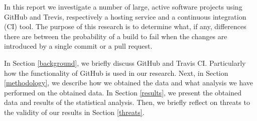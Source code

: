 In this report we investigate a number of large, active software projects using GitHub and Trevis, respectively a hosting service and a continuous integration (CI) tool.
The purpose of this research is to determine what, if any, differences there are between the probability of a build to fail when the changes are introduced by a single commit or a pull request.

In Section \ref{background}, we briefly discuss GitHub and Travis CI.
Particularly how the functionality of GitHub is used in our research.
Next, in Section \ref{methodology}, we describe how we obtained the data and what analysis we have performed on the obtained data.
In Section \ref{results}, we present the obtained data and results of the statistical analysis.
Then, we briefly reflect on threats to the validity of our results in Section \ref{threats}.

